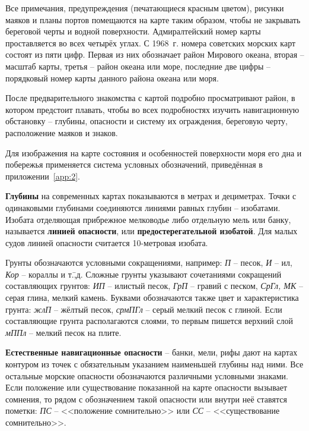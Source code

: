 Все примечания, предупреждения (печатающиеся красным цветом), рисунки
маяков и планы портов помещаются на карте таким образом, чтобы не
закрывать береговой черты и водной поверхности. Адмиралтейский номер
карты проставляется во всех четырёх углах. С 1968~г. номера советских
морских карт состоят из пяти цифр. Первая из них обозначает район
Мирового океана, вторая \--- масштаб карты, третья \--- район океана
или море, последние две цифры \--- порядковый номер карты данного
района океана или моря.

После предварительного знакомства с картой подробно просматривают
район, в котором предстоит плавать, чтобы во всех подробностях изучить
навигационную обстановку \--- глубины, опасности и систему их
ограждения, береговую черту, расположение маяков и знаков.

Для изображения на карте состояния и особенностей поверхности моря его
дна и побережья применяется система условных обозначений, приведённая
в приложении~\ref{app:2}.

\textbf{Глубины} на современных картах
показываются в метрах и дециметрах. Точки с одинаковыми глубинами
соединяются линиями равных глубин \--- изобатами. Изобата отделяющая
прибрежное мелководье либо отдельную мель или банку, называется
\textbf{линией опасности}, или
\textbf{предостерегательной изобатой}.
Для малых судов линией опасности считается 10-метровая изобата.

Грунты обозначаются условными сокращениями, например: \textit{П} \---
песок, \textit{И} \--- ил, \textit{Кор} \--- кораллы и т.\=,д. Сложные
грунты указывают сочетаниями сокращений составляющих грунтов:
\textit{ИП} \--- илистый песок, \textit{ГрП} \--- гравий с песком,
\textit{СрГл, МК} \--- серая глина, мелкий камень. Буквами
обозначаются также цвет и характеристика грунта: \textit{жлП} \---
жёлтый песок, \textit{срмПГл} \--- серый мелкий песок с глиной. Если
составляющие грунта располагаются слоями, то первым пишется верхний
слой \textit{мППл} \--- мелкий песок на плите.

\textbf{Естественные навигационные опасности} \--- банки, мели, рифы
дают на картах контуром из точек с обязательным указанием наименьшей
глубины над ними. Все остальные морские опасности обозначаются
различными условными знаками. Если положение или существование
показанной на карте опасности вызывает сомнения, то рядом с
обозначением такой опасности или внутри неё ставятся пометки:
\textit{ПС} \--- <<положение сомнительно>> или \textit{СС} \---
<<существование сомнительно>>.

